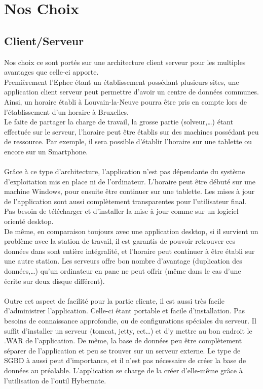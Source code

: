 \section{Nos Choix}

\subsection{Client/Serveur}
Nos choix ce sont portés sur une architecture client serveur pour les multiples
avantages que celle-ci apporte.\\
Premièrement l'Ephec étant un établissement possédant plusieurs sites,
 une application client serveur peut permettre d'avoir un centre de données communes.
 Ainsi, un horaire établi à Louvain-la-Neuve pourra être pris en compte lors de l'établissement d'un horaire à Bruxelles.\\
Le faite de partager la charge de travail, la grosse partie (solveur,…) étant effectuée sur le serveur, l'horaire peut être établis sur des machines possédant peu de ressource. Par exemple, il sera possible d'établir l'horaire sur une tablette ou encore sur un Smartphone.\\ 
\\
Grâce à ce type d'architecture, l'application n'est pas dépendante du système d'exploitation mis en place ni de l'ordinateur. L'horaire peut être débuté sur une machine Windows, pour ensuite être continuer sur une tablette.
Les mises à jour de l'application sont aussi complètement transparentes pour l'utilisateur final. Pas besoin de télécharger et d'installer la mise à jour comme sur un logiciel orienté desktop.\\
De même, en comparaison toujours avec une application desktop, si il survient un problème avec la station de travail, il est garantis de pouvoir retrouver ces données dans sont entière intégralité, et l'horaire peut continuer à être établi sur une autre station. Les serveurs offre bon nombre d'avantage (duplication des données,…) qu'un ordinateur en pane ne peut offrir (même dans le cas d'une écrite sur deux disque différent).\\
\\
Outre cet aspect de facilité pour la partie cliente, il est aussi très facile d'administrer l'application. Celle-ci étant portable et facile d'installation.
Pas besoins de connaissance approfondie, ou de configurations spéciales du serveur. Il suffit d'installer un serveur (tomcat, jetty, ect…) et d'y mettre au bon endroit le .WAR de l'application. De même, la base de données peu être complètement séparer de l'application et peu se trouver sur un serveur externe. Le type de SGBD à aussi peut d'importance, et il n'est pas nécessaire de créer la base de données au préalable. L'application se charge de la créer d'elle-même grâce à l'utilisation de l'outil Hybernate.

